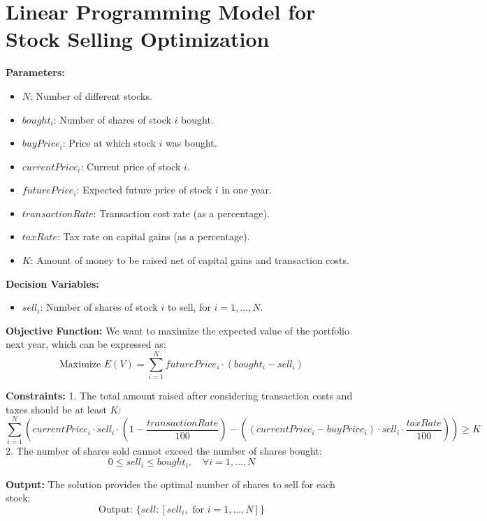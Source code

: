 \documentclass{article}
\begin{document}
\section*{Linear Programming Model for Stock Selling Optimization}

\textbf{Parameters:}
\begin{itemize}
    \item $N$: Number of different stocks.
    \item $bought_i$: Number of shares of stock $i$ bought.
    \item $buyPrice_i$: Price at which stock $i$ was bought.
    \item $currentPrice_i$: Current price of stock $i$.
    \item $futurePrice_i$: Expected future price of stock $i$ in one year.
    \item $transactionRate$: Transaction cost rate (as a percentage).
    \item $taxRate$: Tax rate on capital gains (as a percentage).
    \item $K$: Amount of money to be raised net of capital gains and transaction costs.
\end{itemize}

\textbf{Decision Variables:}
\begin{itemize}
    \item $sell_i$: Number of shares of stock $i$ to sell, for $i = 1, \ldots, N$.
\end{itemize}

\textbf{Objective Function:}
We want to maximize the expected value of the portfolio next year, which can be expressed as:
\[
\text{Maximize } E(V) = \sum_{i=1}^{N} futurePrice_i \cdot (bought_i - sell_i) 
\]

\textbf{Constraints:}
1. The total amount raised after considering transaction costs and taxes should be at least $K$:
\[
\sum_{i=1}^{N} \left( currentPrice_i \cdot sell_i \cdot (1 - \frac{transactionRate}{100}) - \left( (currentPrice_i - buyPrice_i) \cdot sell_i \cdot \frac{taxRate}{100} \right) \right) \geq K
\]
2. The number of shares sold cannot exceed the number of shares bought:
\[
0 \leq sell_i \leq bought_i, \quad \forall i = 1, \ldots, N
\]

\textbf{Output:}
The solution provides the optimal number of shares to sell for each stock:
\[
\text{Output: } \{ sell : [sell_i, \text{ for } i = 1, \ldots, N] \}
\]
\end{document}
